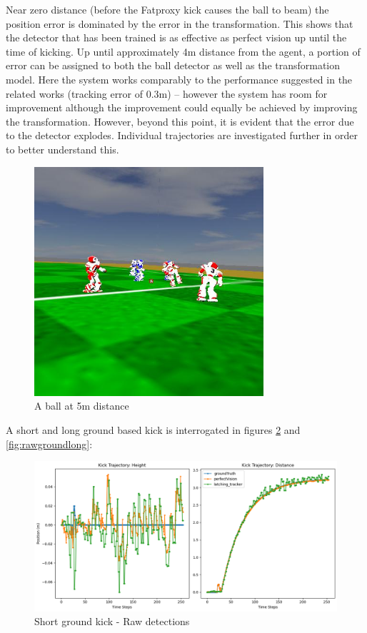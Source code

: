 \documentclass[a4paper,twoside,12pt]{report}
\begin{document}
Near zero distance (before the Fatproxy kick causes the ball to beam) the position error is dominated by the error in the transformation. This shows that the detector that has been trained is as effective as perfect vision up until the time of kicking. Up until approximately 4m distance from the agent, a portion of error can be assigned to both the ball detector as well as the transformation model. Here the system works comparably to the performance suggested in the related works (tracking error of 0.3m) -- however the system has room for improvement although the improvement could equally be achieved by improving the transformation. However, beyond this point, it is evident that the error due to the detector explodes. Individual trajectories are investigated further in order to better understand this.

\begin{figure}[h!]
\begin{center}
\includegraphics[width=8.5cm]{images/5mball.jpeg}
\caption{A ball at 5m distance}
\label{fig:farball}
\end{center}
\end{figure}

A short and long ground based kick is interrogated in figures \ref{fig:rawgroundshort} and \ref{fig:rawgroundlong}:

\begin{figure}[h!]
\begin{center}
\includegraphics[width=14cm]{images/raw_ground_short.png}
\caption{Short ground kick - Raw detections}
\label{fig:rawgroundshort}
\end{center}
\end{figure}
\end{document}
